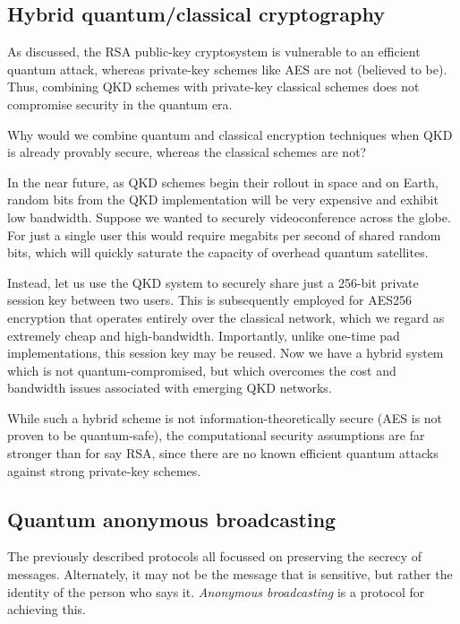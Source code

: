 \subsection{Hybrid quantum/classical cryptography}

As discussed, the RSA public-key cryptosystem is vulnerable to an efficient quantum attack, whereas private-key schemes like AES are not (believed to be). Thus, combining QKD schemes with private-key classical schemes does not compromise security in the quantum era.

Why would we combine quantum and classical encryption techniques when QKD is already provably secure, whereas the classical schemes are not?

In the near future, as QKD schemes begin their rollout in space and on Earth, random bits from the QKD implementation will be very expensive and exhibit low bandwidth. Suppose we wanted to securely videoconference across the globe. For just a single user this would require megabits per second of shared random bits, which will quickly saturate the capacity of overhead quantum satellites.

Instead, let us use the QKD system to securely share just a 256-bit private session key between two users. This is subsequently employed for AES256 encryption that operates entirely over the classical network, which we regard as extremely cheap and high-bandwidth. Importantly, unlike one-time pad implementations, this session key may be reused. Now we have a hybrid system which is not quantum-compromised, but which overcomes the cost and bandwidth issues associated with emerging QKD networks.

While such a hybrid scheme is not information-theoretically secure (AES is not proven to be quantum-safe), the computational security assumptions are far stronger than for say RSA, since there are no known efficient quantum attacks against strong private-key schemes.

%
%

\subsection{Quantum anonymous broadcasting} \label{sec:anon_broad} 

The previously described protocols all focussed on preserving the secrecy of messages. Alternately, it may not be the message that is sensitive, but rather the identity of the person who says it. \textit{Anonymous broadcasting} is a protocol for achieving this.

